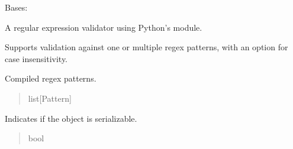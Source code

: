 \documentclass[letterpaper,10pt,english]{sphinxmanual}
\begin{document}
\begin{fulllineitems}
\label{\detokenize{apache_commons_validator_python.routines:apache_commons_validator_python.routines.regex_validator.RegexValidator}}
\pysigstartsignatures
{}
\pysigstopsignatures
\sphinxAtStartPar
Bases: 

\sphinxAtStartPar
A regular expression validator using Python’s  module.

\sphinxAtStartPar
Supports validation against one or multiple regex patterns, with an option for case insensitivity.

\begin{fulllineitems}
\label{\detokenize{apache_commons_validator_python.routines:apache_commons_validator_python.routines.regex_validator.RegexValidator.patterns}}
\pysigstartsignatures
{}
\pysigstopsignatures
\sphinxAtStartPar
Compiled regex patterns.
\begin{quote}\begin{description}
\sphinxAtStartPar
list{[}Pattern{]}

\end{description}\end{quote}

\end{fulllineitems}


\begin{fulllineitems}
\label{\detokenize{apache_commons_validator_python.routines:apache_commons_validator_python.routines.regex_validator.RegexValidator.serializable}}
\pysigstartsignatures
{}
\pysigstopsignatures
\sphinxAtStartPar
Indicates if the object is serializable.
\begin{quote}\begin{description}
\sphinxAtStartPar
bool


\end{description}
\end{quote}
\end{fulllineitems}
\end{fulllineitems}
\end{document}
